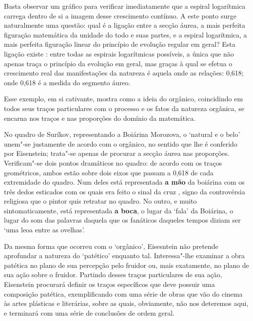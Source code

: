Basta observar um gráfico para verificar imediatamente que a espiral
logarítmica carrega dentro de si a imagem desse crescimento contínuo. A
este ponto surge naturalmente uma questão: qual é a ligação entre a
secção áurea, a mais perfeita figuração matemática da unidade do todo e
suas partes, e a espiral logarítmica, a mais perfeita figuração linear
do princípio de evolução regular em geral? Esta ligação existe : entre
todas as espirais logarítmicas possíveis, a única que não apenas traça o
princípio da evolução em geral, mas graças à qual se efetua o
crescimento real das manifestações da natureza é aquela onde as
relações:
0,618; onde 0,618 é a medida do segmento áureo.

Esse exemplo, em si cativante, mostra como a ideia do orgânico,
coincidindo em todos seus traços particulares com o processo e os fatos
da natureza orgânica, se encarna nos traços e nas proporções do domínio
da matemática.

No quadro de Suríkov, representando a Boiárina Morozova, o `natural e o
belo' unem"-se justamente de acordo com o orgânico, no sentido que lhe é
conferido por Eisenstein; trata"-se apenas de procurar a secção áurea nas
proporções. Verificam"-se dois pontos dramáticos no quadro: de acordo com
os traços geométricos, ambos estão sobre dois eixos que passam a 0,618
de cada extremidade do quadro. Num deles está representada \textbf{a
mão} da boiárina com os três dedos esticados com os quais era feito o
sinal da cruz , signo da controvérsia religiosa que o pintor quis
retratar no quadro. No outro, e muito sintomaticamente, está
representada \textbf{a boca}, o lugar da `fala' da Boiárina, o lugar do
som das palavras daquela que os fanáticos daqueles tempos diziam ser
`uma leoa entre as ovelhas'.


Da mesma forma que ocorreu com o `orgânico', Eisesntein não pretende
aprofundar a natureza do `patético' enquanto tal. Interessa"-lhe examinar
a obra patética no plano de sua percepção pelo fruidor ou, mais
exatamente, no plano de sua ação sobre o fruidor. Partindo desses traços
particulares de sua ação, Eisenstein procurará definir os traços
específicos que deve possuir uma composição patética, exemplificando com
uma série de obras que vão do cinema às artes plásticas e literárias,
sobre as quais, obviamente, não nos deteremos aqui, e terminará com uma
série de conclusões de ordem geral.

